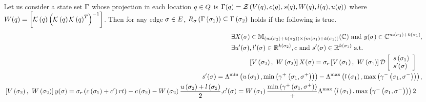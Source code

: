 \begin{lemma}
  Let us consider a state set $\Gamma$ whose projection in each location
  $q\in Q$ is $\Gamma(q) =
  \mathcal{Z}\left(V(q),c(q),s(q),W(q),l(q),u(q)\right)$ where
  $W(q)={\left[\mathcal{K}\left(q\right)\left(\mathcal{K}\left(q\right)\mathcal{K}\left(q\right)^T\right)^{-1}\right]}$.  Then for any edge
  $\sigma\in E$, $R_{\sigma}\left(\Gamma\left(\sigma_{1}\right)\right) \subseteq
  \Gamma\left(\sigma_{2}\right)$
    holds if the following is true.
\begin{align}
\begin{split}
& \exists X(\sigma)\in
\mathbb{M}_{\left(m\left(\sigma_{2}\right)+k\left(\sigma_{2}\right)\right)\times \left(m\left(\sigma_{1}\right)+k\left(\sigma_{1}\right)\right)}(\mathbb{\mathbb{C}})~\text{and}~y(\sigma)\in
\mathbb{C}^{m\left(\sigma_{1}\right)+k\left(\sigma_{1}\right)},\\
& \exists u^\prime(\sigma),l^\prime(\sigma)\in \mathbb{R}^{k\left(\sigma_{2}\right)}, c~\text{and}~s^\prime(\sigma)\in\mathbb{R}^{k\left(\sigma_{1}\right)}~\text{s.t.}\\
\end{split}\\
\begin{split}
& \left[V\left(\sigma_{2}\right),~W\left(\sigma_{2}\right)\right]X(\sigma) = \sigma_r\left[V\left(\sigma_{1}\right),~W\left(\sigma_{1}\right)\right]\mathcal{D}
\left[\begin{array}{l}{s\left(\sigma_{1}\right)}\\{s^\prime(\sigma)} \end{array}\right]
\end{split}\\
\begin{split}
s^\prime(\sigma) = \Lambda^{\min}\left(u\left(\sigma_{1}\right),\min\left(\gamma^+\left(\sigma_{1},\sigma^+\right)\right)\right)-
\Lambda^{\max}\left(l\left(\sigma_{1}\right),\max\left(\gamma^-\left(\sigma_{1},\sigma^-\right)\right)\right),\\
\end{split}\\
\begin{split}
& \left[V\left(\sigma_{2}\right),~W\left(\sigma_{2}\right)\right]y(\sigma) = \sigma_r\left(c\left(\sigma_{1}\right)+c^\prime\right)rt)- 
c\left(\sigma_{2}\right) - W\left(\sigma_{2}\right)\frac{u\left(\sigma_{2}\right)+l\left(\sigma_{2}\right)}{2},\\
\end{split}
\begin{split}
& c^\prime(\sigma) = W\left(\sigma_{1}\right)\frac{\min\left(\gamma^+\left(\sigma_{1},\sigma^+\right)\right)}+
\Lambda^{\max}\left(l\left(\sigma_{1}\right),\max\left(\gamma^-\left(\sigma_{1},\sigma^-\right)\right)\right){2}
\end{split}
\end{align}
\end{lemma}